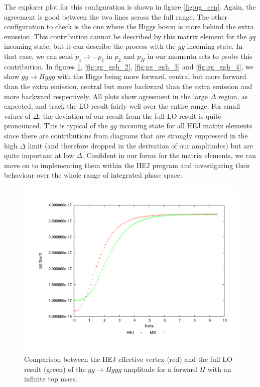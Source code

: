 The explorer plot for this configuration is shown in figure \ref{fig:ug_cen}. Again, the agreement is good between the two lines across the full range. The other configuration to check is the one where the Higgs boson is more behind the extra emission. This contribution cannot be described by this matrix element for the $gq$ incoming state, but it can describe the process with the $gg$ incoming state.  In that case, we can send $p_z \to -p_z$ in $p_2$ and $p_H$ in our momenta sets to probe this contribution. In figures \ref{fig:gg_ggh_1}, \ref{fig:gg_ggh_2}, \ref{fig:gg_ggh_3} and \ref{fig:gg_ggh_4}, we show $gg \to Hggg$ with the Higgs being more forward, central but more forward than the extra emission, central but more backward than the extra emission and more backward respectively. All plots show agreement in the large $\Delta$ region, as expected, and track the LO result fairly well over the entire range. For small values of $\Delta$, the deviation of our result from the full LO result is quite pronounced. This is typical of the $gg$ incoming state for all HEJ matrix elements \cite{Andersen2009a} since there are contributions from diagrams that are strongly suppressed in the high $\Delta$ limit (and therefore dropped in the derivation of our amplitudes) but are quite important at low $\Delta$. Confident in our forms for the matrix elements, we can move on to implementing them within the HEJ program and investigating their behaviour over the whole range of integrated phase space.

\begin{figure}[t]
\centering
\includegraphics[scale=0.45]{Images/gg_nextfor.pdf}
\caption{Comparison between the HEJ effective vertex (red) and the full LO result (green) of the $gg \to Hggg$ amplitude for a forward $H$ with an infinite top mass.}
\label{fig:gg_ggh_1}
\end{figure}

